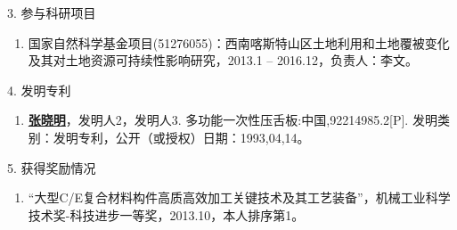 \begin{achievement}
3. 参与科研项目
\begin{enumerate}[nosep, label=$\lbrack$\arabic*$\rbrack$]
  \item{国家自然科学基金项目(51276055)：西南喀斯特山区土地利用和土地覆被变化及其对土地资源可持续性影响研究，2013.1 – 2016.12，负责人：李文。} %
\end{enumerate}{}\vspace{1em}

4. 发明专利
\begin{enumerate}[nosep, label=$\lbrack$\arabic*$\rbrack$]
  \item{\underline{\bf 张晓明}，发明人2，发明人3. 多功能一次性压舌板:中国,92214985.2[P]. 发明类别：发明专利，公开（或授权）日期：1993,04,14。} %
\end{enumerate}{}\vspace{1em}

5. 获得奖励情况
\begin{enumerate}[nosep, label=$\lbrack$\arabic*$\rbrack$]
  \item{“大型C/E复合材料构件高质高效加工关键技术及其工艺装备”，机械工业科学技术奖-科技进步一等奖，2013.10，本人排序第1。}
\end{enumerate}

\end{achievement}



